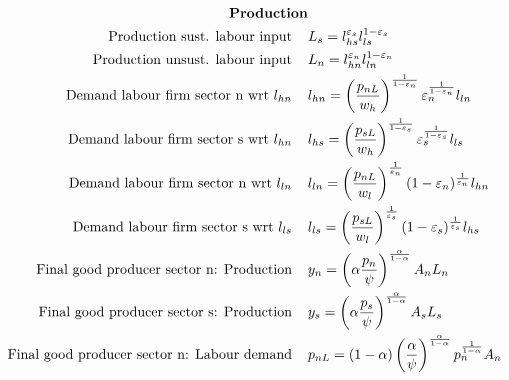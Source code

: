 \begin{align}
\text{\textbf{Production}}& \nonumber \\
\text{Production sust. labour input} \hspace{4mm}& L_s =l_{hs}^{\varepsilon_s}l_{ls}^{1-\varepsilon_s}\label{mod:labS}\\ 
\text{Production unsust. labour input} \hspace{4mm}& L_n =l_{hn}^{\varepsilon_n}l_{ln}^{1-\varepsilon_n}\label{mod:labN}\\
%
\text{Demand labour firm sector n wrt } l_{hn}\hspace{4mm}&l_{hn}= \left(\frac{p_{nL}}{w_h}\right)^{\frac{1}{1-\varepsilon_n}}\varepsilon_n^{\frac{1}{1-\varepsilon_n}}l_{ln}\label{mod:opt_labhn}\\
%
\text{Demand labour firm sector s wrt } l_{hn}\hspace{4mm}&l_{hs}= \left(\frac{p_{sL}}{w_h}\right)^{\frac{1}{1-\varepsilon_s}}\varepsilon_s^{\frac{1}{1-\varepsilon_s}}l_{ls}\label{mod:opt_labhs}\\
%
\text{Demand labour firm sector n wrt } l_{ln}\hspace{4mm}&
l_{ln}= \left(\frac{p_{nL}}{w_l}\right)^\frac{1}{\varepsilon_n}(1-\varepsilon_n)^\frac{1}{\varepsilon_n}l_{hn}\label{mod:opt_labln}\\
%
\text{Demand labour firm sector s wrt } l_{ls}\hspace{4mm}&
l_{ls}= \left(\frac{p_{sL}}{w_l}\right)^\frac{1}{\varepsilon_s}(1-\varepsilon_s)^\frac{1}{\varepsilon_s}l_{hs}\label{mod:opt_labls}\\
%
\text{Final good producer sector n: Production}\hspace{4mm}&y_n
=  \left(\alpha\frac{p_n}{\psi}\right)^{\frac{\alpha}{1-\alpha}}A_n L_n \label{mod:prod_n} \\ 
%
\text{Final good producer sector s: Production}\hspace{4mm}&y_s
=  \left(\alpha\frac{p_s}{\psi}\right)^{\frac{\alpha}{1-\alpha}}A_s L_s \label{mod:prod_s} \\
%
\text{Final good producer sector n: Labour demand}\hspace{4mm}&
p_{nL} =%
(1-\alpha)\left(\frac{\alpha}{\psi}\right)^\frac{\alpha}{1- \alpha}p_n^\frac{1}{1-\alpha}A_n\label{mod:pnl}

\end{align}
